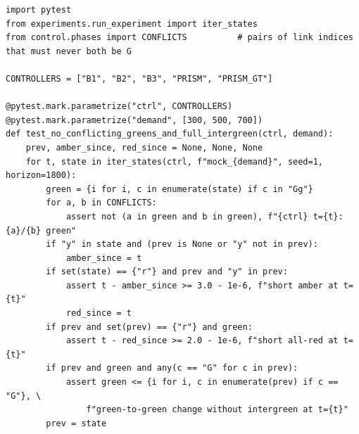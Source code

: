\begin{lstlisting}[style=py,caption={pytest checking conflicting greens and intergreens on every step},label={lst:app-test}]
import pytest
from experiments.run_experiment import iter_states
from control.phases import CONFLICTS          # pairs of link indices that must never both be G

CONTROLLERS = ["B1", "B2", "B3", "PRISM", "PRISM_GT"]

@pytest.mark.parametrize("ctrl", CONTROLLERS)
@pytest.mark.parametrize("demand", [300, 500, 700])
def test_no_conflicting_greens_and_full_intergreen(ctrl, demand):
    prev, amber_since, red_since = None, None, None
    for t, state in iter_states(ctrl, f"mock_{demand}", seed=1, horizon=1800):
        green = {i for i, c in enumerate(state) if c in "Gg"}
        for a, b in CONFLICTS:
            assert not (a in green and b in green), f"{ctrl} t={t}: {a}/{b} green"
        if "y" in state and (prev is None or "y" not in prev):
            amber_since = t
        if set(state) == {"r"} and prev and "y" in prev:
            assert t - amber_since >= 3.0 - 1e-6, f"short amber at t={t}"
            red_since = t
        if prev and set(prev) == {"r"} and green:
            assert t - red_since >= 2.0 - 1e-6, f"short all-red at t={t}"
        if prev and green and any(c == "G" for c in prev):
            assert green <= {i for i, c in enumerate(prev) if c == "G"}, \
                f"green-to-green change without intergreen at t={t}"
        prev = state
\end{lstlisting}
